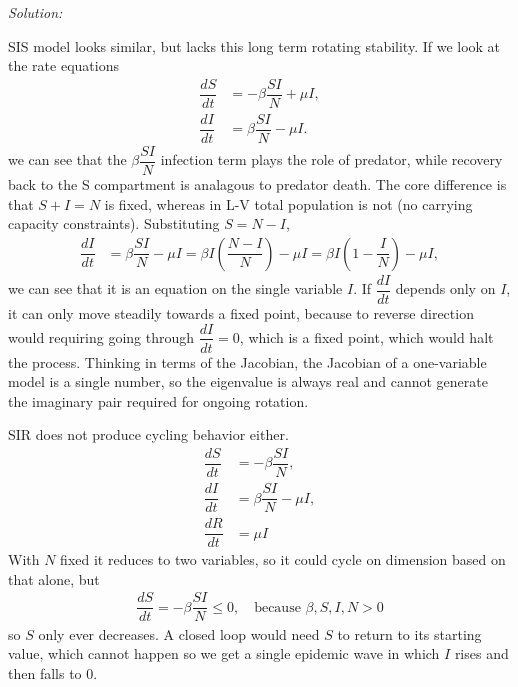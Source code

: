 \documentclass{article}
\newenvironment{solution}
    {\noindent \textit{Solution:}\vspace{1em}\\}
    {\newpage}
\newcommand{\pl}{\left(}
\newcommand{\pr}{\right)}
\begin{document}
\begin{solution}
\begin{enumerate}
\begin{enumerate}
        SIS model looks similar, but lacks this long term rotating stability. If we look at the
        rate equations 
        \begin{align*}
            \dfrac{dS}{dt} &= -\beta \dfrac{SI}{N} + \mu I, \\
            \dfrac{dI}{dt} &= \beta \dfrac{SI}{N} - \mu I.
        \end{align*}
        we can see that the $\beta \dfrac{SI}{N}$ infection term plays the role of predator,
        while recovery back to the S compartment is analagous to predator death. The core 
        difference is that $S+I=N$ is fixed, whereas in L-V total population is not (no
        carrying capacity constraints). Substituting $S = N - I$,
        \begin{align*}
            \dfrac{dI}{dt} &= \beta \dfrac{SI}{N} - \mu I = \beta I\pl\dfrac{N-I}{N}\pr-\mu I=\beta I \pl 1 - \dfrac{I}{N} \pr - \mu I,
        \end{align*}
        we can see that it is an equation on the single variable $I$. If $\dfrac{dI}{dt}$ depends only on $I$,
        it can only move steadily towards a fixed point, because to reverse direction would requiring
        going through $\dfrac{dI}{dt}=0$, which is a fixed point, which would halt the process. 
        Thinking in terms of the Jacobian, the Jacobian of a one-variable model is a single number, so 
        the eigenvalue is always real and cannot generate the imaginary pair required for ongoing rotation. 
        
        SIR does not produce cycling behavior either. 
        \begin{align*}
            \dfrac{dS}{dt} &= -\beta \dfrac{SI}{N}, \\
            \dfrac{dI}{dt} &= \beta \dfrac{SI}{N} - \mu I, \\
            \dfrac{dR}{dt} &= \mu I
        \end{align*}
        With $N$ fixed it reduces to two variables, so it
        could cycle on dimension based on that alone, but
        \begin{align*}
            \dfrac{dS}{dt} = -\beta \dfrac{SI}{N} \le 0, \quad \text{because }\beta,S,I,N>0
        \end{align*}
        so $S$ only ever decreases. A closed loop would need $S$ to return to its starting value, which 
        cannot happen so we get a single epidemic wave in which $I$ rises and then falls to $0$. 
        

\end{enumerate}
\end{enumerate}
\end{solution}
\end{document}

